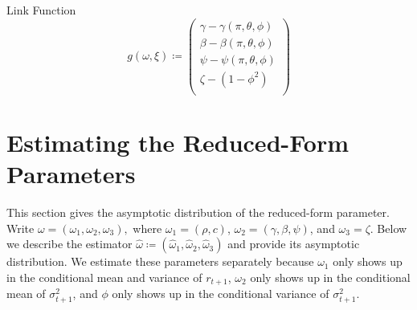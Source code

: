 \documentclass[11pt, letterpaper, twoside]{article}
\begin{document}
%
\begin{defn}{Link Function}
    \label{defn:link_function}
    \begin{equation}
        g(\omega, \xi) \coloneqq
%
        \begin{pmatrix}
            \gamma - \gamma(\pi, \theta, \phi) \\ 
            \beta - \beta(\pi, \theta, \phi) \\
            \psi - \psi(\pi, \theta, \phi)  \\
            \zeta - (1 - \phi^2)  \\
        \end{pmatrix}
%
\end{equation}

\end{defn}



\section{Estimating the Reduced-Form Parameters}\label{sec:EstimatingReducedForm}

This section gives the asymptotic distribution of the reduced-form parameter. Write $\omega =(\omega_{1},\omega_{2},\omega_{3}),$ where $\omega_{1}=(\rho ,c)$, $\omega_{2} = (\gamma, \beta, \psi)$, and $\omega_{3} = \zeta$. Below we describe the estimator $\widehat{\omega} \coloneqq (\widehat{\omega}_{1},\widehat{\omega}_{2},\widehat{\omega}_{3})$ and provide its asymptotic distribution. We estimate these parameters separately because $\omega_{1}$ only shows up in the conditional mean and variance of $r_{t+1}$, $\omega_{2}$ only shows up in the conditional mean of $\sigma_{t+1}^{2}$, and $\phi $ only shows up in the conditional variance of $\sigma_{t+1}^{2}.$ 
\end{document}

